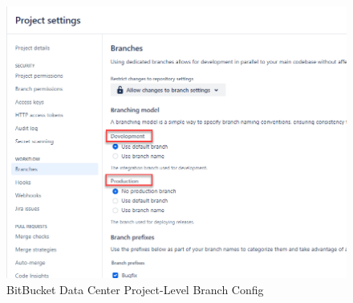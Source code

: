 \begin{figure}[ht]
    \includegraphics[width=\textwidth]{graphics/bbdc-branch-config.png}
    \caption{BitBucket Data Center Project-Level Branch Config}
    \label{fig:bbdc-branch-config}
\end{figure}

